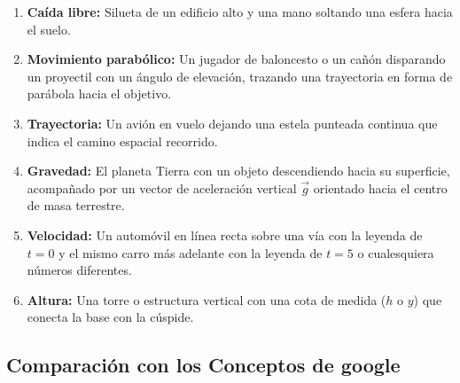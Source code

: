 \documentclass[11pt,a4paper]{article}
\begin{document}
	\begin{enumerate}
		\item \textbf{Caída libre:} Silueta de un edificio alto y una mano soltando una esfera hacia el suelo.
		\item \textbf{Movimiento parabólico:} Un jugador de baloncesto o un cañón disparando un proyectil con un ángulo de elevación, trazando una trayectoria en forma de parábola hacia el objetivo.
		\item \textbf{Trayectoria:} Un avión en vuelo dejando una estela punteada continua que indica el camino espacial recorrido.
		\item \textbf{Gravedad:} El planeta Tierra con un objeto descendiendo hacia su superficie, acompañado por un vector de aceleración vertical $\vec{g}$ orientado hacia el centro de masa terrestre.
		\item \textbf{Velocidad:} Un automóvil en línea recta sobre una vía con la leyenda de $t=0$ y el mismo carro más adelante con la leyenda de $t=5$ o cualesquiera números diferentes.
		\item \textbf{Altura:} Una torre o estructura vertical con una cota de medida ($h$ o $y$) que conecta la base con la cúspide.
	\end{enumerate}
	
	\subsection{Comparación con los Conceptos de google}
	
\end{document}
